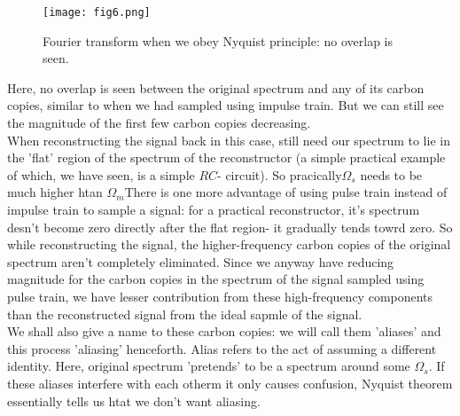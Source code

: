 \begin{figure}[htb]
\centering
\texttt{[image: fig6.png]}
\caption{\label{fig:fig6}Fourier transform when we obey Nyquist principle: no overlap is seen.}
\end{figure}

Here, no overlap is seen between the original spectrum and any of its carbon copies, similar to when we had sampled using impulse train. But we can still see the magnitude of the first few carbon copies decreasing.\\
When reconstructing the signal back in this case, still need our spectrum to lie in the 'flat' region of the spectrum of the reconstructor (a simple practical example of which,  we have seen, is a simple $RC$- circuit). So pracically$\Omega_s$ needs to be much higher htan $\Omega_m$There is one more advantage of using pulse train instead of impulse train to sample a signal: for a practical reconstructor, it's spectrum desn't become zero directly after the flat region- it gradually tends towrd zero. So while reconstructing the signal, the higher-frequency carbon copies of the original spectrum aren't completely eliminated. Since we anyway have reducing magnitude for the carbon copies in the spectrum of the signal sampled using pulse train, we have lesser contribution from these high-frequency components than the reconstructed signal from the ideal sapmle of the signal.\\
We shall also give a name to these carbon copies: we will call them 'aliases' and this process 'aliasing' henceforth. Alias refers to the act of assuming a different identity. Here, original spectrum 'pretends' to be a spectrum around some $\Omega_s$. If these aliases interfere with each otherm it only causes confusion, Nyquist theorem essentially tells us htat we don't want aliasing.
